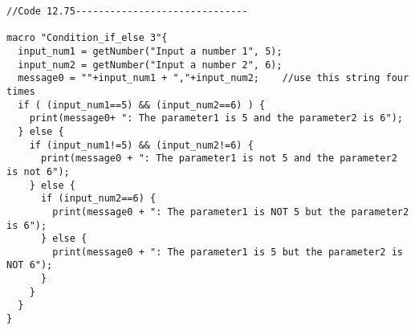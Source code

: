 \begin{lstlisting}[morekeywords={*, if, else}]
//Code 12.75------------------------------

macro "Condition_if_else 3"{
  input_num1 = getNumber("Input a number 1", 5);
  input_num2 = getNumber("Input a number 2", 6);
  message0 = ""+input_num1 + ","+input_num2;	//use this string four times
  if ( (input_num1==5) && (input_num2==6) ) {
    print(message0+ ": The parameter1 is 5 and the parameter2 is 6");
  } else {
    if (input_num1!=5) && (input_num2!=6) {
      print(message0 + ": The parameter1 is not 5 and the parameter2 is not 6");
    } else {
      if (input_num2==6) {
        print(message0 + ": The parameter1 is NOT 5 but the parameter2 is 6");
      } else {
        print(message0 + ": The parameter1 is 5 but the parameter2 is NOT 6");
      }
    }
  }
}

\end{lstlisting}